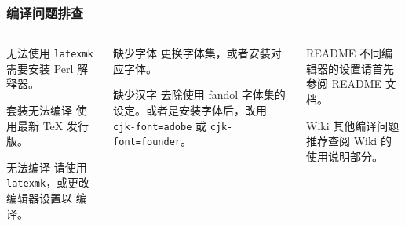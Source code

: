 \begin{frame}[label=compile]
  \frametitle{编译问题排查}
  \begin{columns}
    \begin{column}{0.33\textwidth}
      \begin{alertblock}{无法使用 \texttt{latexmk}}
         需要安装 Perl 解释器。
      \end{alertblock}  
      \begin{alertblock}{\CTeX{} 套装无法编译}
        使用最新 \TeX{} 发行版。
      \end{alertblock}
      \begin{alertblock}{ 无法编译}
        请使用 \texttt{latexmk}，或更改编辑器设置以  编译。
      \end{alertblock}
    \end{column}
    \begin{column}{0.33\textwidth}
      \begin{alertblock}{缺少字体 }
        更换字体集，或者安装对应字体。
      \end{alertblock}
      \begin{alertblock}{缺少汉字 }
        去除使用 fandol 字体集的设定。或者是安装字体后，改用 \texttt{cjk-font=adobe} 或 \texttt{cjk-font=founder}。
      \end{alertblock}
    \end{column}
    \begin{column}{0.33\textwidth}
      \begin{block}{\faInfoCircle{} README}
        不同编辑器的设置请首先参阅 README  文档。
      \end{block}
      \begin{block}{\faBookOpen{} Wiki}
        其他编译问题推荐查阅 Wiki  的使用说明部分。
      \end{block}
    \end{column}
  \end{columns}
\end{frame}

